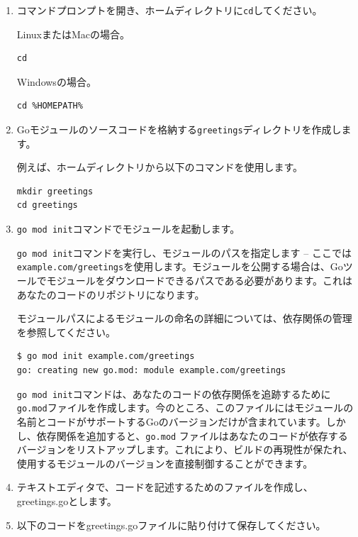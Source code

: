 \begin{enumerate}
\item コマンドプロンプトを開き、ホームディレクトリに\texttt{cd}してください。

LinuxまたはMacの場合。
\begin{lstlisting}[numbers=none]
cd
\end{lstlisting}
Windowsの場合。
\begin{lstlisting}[numbers=none]
cd %HOMEPATH%
\end{lstlisting}

\item Goモジュールのソースコードを格納する\texttt{greetings}ディレクトリを作成します。

例えば、ホームディレクトリから以下のコマンドを使用します。
\begin{lstlisting}[numbers=none]
mkdir greetings
cd greetings
\end{lstlisting}

\item \texttt{go mod init}コマンドでモジュールを起動します。

\texttt{go mod init}コマンドを実行し、モジュールのパスを指定します -- ここでは\texttt{example.com/greetings}を使用します。モジュールを公開する場合は、Goツールでモジュールをダウンロードできるパスである必要があります。これはあなたのコードのリポジトリになります。

モジュールパスによるモジュールの命名の詳細については、依存関係の管理 を参照してください。

\begin{lstlisting}[numbers=none]
$ go mod init example.com/greetings
go: creating new go.mod: module example.com/greetings
\end{lstlisting}

\texttt{go mod init}コマンドは、あなたのコードの依存関係を追跡するために\texttt{go.mod}ファイルを作成します。今のところ、このファイルにはモジュールの名前とコードがサポートするGoのバージョンだけが含まれています。しかし、依存関係を追加すると、\texttt{go.mod} ファイルはあなたのコードが依存するバージョンをリストアップします。これにより、ビルドの再現性が保たれ、使用するモジュールのバージョンを直接制御することができます。

\item テキストエディタで、コードを記述するためのファイルを作成し、greetings.goとします。

\item 以下のコードをgreetings.goファイルに貼り付けて保存してください。


\end{enumerate}
